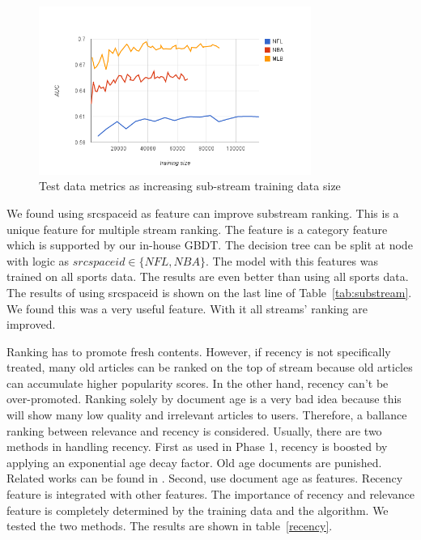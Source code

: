 \begin{figure}
\caption{Test data metrics as increasing sub-stream training data size}\label{fig:curve}
\centering
\includegraphics[width=3.5in]{training-curve.png}

\end{figure}

We found using srcspaceid as feature can improve substream ranking. This is a unique feature for multiple stream ranking. The feature is a category feature which is supported by our in-house GBDT.  The decision tree can be split at node with logic as  $srcspaceid \in \{NFL,NBA\}$.  The model with this features was trained on all sports data.  The results are even better  than using all sports data. The results of using srcspaceid is shown on the last line of  Table~\ref{tab:substream}.   We found this was a very useful feature. With it all streams' ranking are improved. 
 




  
 Ranking has to promote fresh contents.  However, if recency is not specifically treated,   many old articles can be ranked on the top of stream because old articles can accumulate higher popularity scores.  In the other hand, recency can't be over-promoted.  Ranking solely by document age is a very bad idea because this will show many low quality and irrelevant articles to users. Therefore, a ballance ranking between relevance and recency is considered.  Usually, there are two methods in handling recency. First as used in Phase 1, recency is boosted by applying an exponential age decay factor. Old age documents are punished.  Related works can be found in \cite{Li:2003:TLM:956863.956951,Metzler:2009:ISR:1571941.1572085}. Second,  use document age as features. Recency feature is integrated with other features. The importance of recency and relevance feature is completely determined by the training data and the algorithm. We tested the two methods. The results are shown in table~\ref{recency}.

